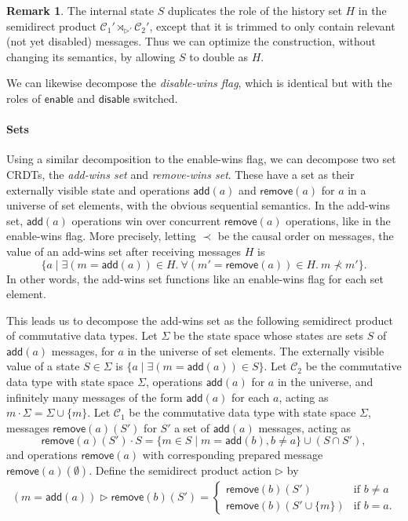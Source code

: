 \documentclass[acmsmall,nonacm]{acmart}
\newcommand{\mc}[1]{\ensuremath{\mathcal{#1}}}
\newcommand{\msf}[1]{\ensuremath{\mathsf{#1}}}
\newcommand{\act}{\triangleright}
\theoremstyle{plain}
\theoremstyle{definition}
\newtheorem{myrmk}[mythm]{Remark}
\begin{document}
\begin{myrmk}
The internal state $S$ duplicates the role of the history set $H$ in the semidirect product $\mc{C}_1' \rtimes_{\act'} \mc{C}_2'$, except that it is trimmed to only contain relevant (not yet disabled) messages.  Thus we can optimize the construction, without changing its semantics, by allowing $S$ to double as $H$.
\end{myrmk}

We can likewise decompose the \textit{disable-wins flag}, which is identical but with the roles of $\msf{enable}$ and $\msf{disable}$ switched.


\paragraph{Sets}
Using a similar decomposition to the enable-wins flag, we can decompose two set CRDTs, the \textit{add-wins set} and \textit{remove-wins set}.  These have a set as their externally visible state and operations $\msf{add}(a)$ and $\msf{remove}(a)$ for $a$ in a universe of set elements, with the obvious sequential semantics.  In the add-wins set, $\msf{add}(a)$ operations win over concurrent $\msf{remove}(a)$ operations, like in the enable-wins flag.  More precisely, letting $\prec$ be the causal order on messages, the value of an add-wins set after receiving messages $H$ is
\[
\{a \mid \exists (m = \msf{add}(a)) \in H.\ \forall (m' = \msf{remove}(a)) \in H.\ m \nprec m'\}.
\]
In other words, the add-wins set functions like an enable-wins flag for each set element.

This leads us to decompose the add-wins set as the following semidirect product of commutative data types.  Let $\Sigma$ be the state space whose states are sets $S$ of $\msf{add}(a)$ messages, for $a$ in the universe of set elements.  The externally visible value of a state $S \in \Sigma$ is $\{a \mid \exists (m = \msf{add}(a)) \in S\}$.  Let $\mc{C}_2$ be the commutative data type with state space $\Sigma$, operations $\msf{add}(a)$ for $a$ in the universe, and infinitely many messages of the form $\msf{add}(a)$ for each $a$, acting as $m \cdot \Sigma = \Sigma \cup \{m\}$.  Let $\mc{C}_1$ be the commutative data type with state space $\Sigma$, messages $\msf{remove}(a)(S')$ for $S'$ a set of $\msf{add}(a)$ messages, acting as
\[
\msf{remove}(a)(S') \cdot S = \{m \in S \mid m = \msf{add}(b), b \neq a\} \cup (S \cap S'),
\]
and operations $\msf{remove}(a)$ with corresponding prepared message $\msf{remove}(a)(\emptyset)$.  Define the semidirect product action $\act$ by
\begin{align*}
(m = \msf{add}(a)) \act \msf{remove}(b)(S') = \begin{cases} \msf{remove}(b)(S') &\mbox{if $b \neq a$} \\ \msf{remove}(b)(S' \cup \{m\}) &\mbox{if $b = a$}. \end{cases}
\end{align*}
\end{document}
